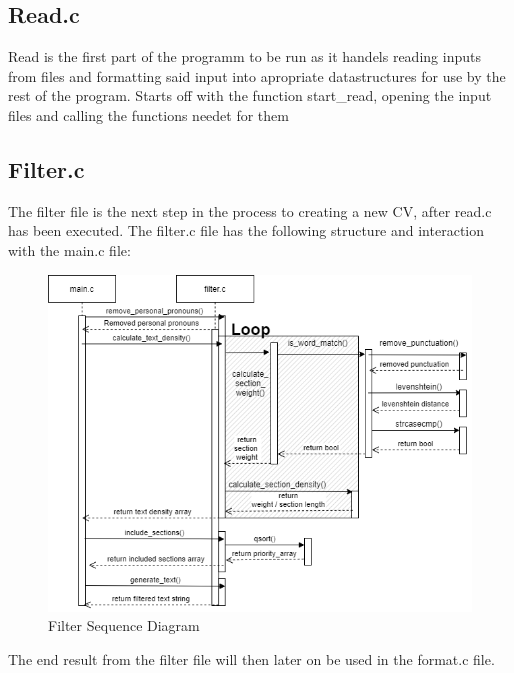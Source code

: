 \subsection{Read.c}
Read is the first part of the programm to be run as it handels reading inputs from files and formatting said input into apropriate datastructures for use by the rest of the program.
Starts off with the function start\_read, opening the input files and calling the functions needet for them

\subsection{Filter.c}
The filter file is the next step in the process to creating a new CV, after read.c has been executed.
The filter.c file has the following structure and interaction with the main.c file:
\begin{figure}[H]
  \centering
  \includegraphics[scale = 0.6]{figures/filter_flow.png}
  \caption{Filter Sequence Diagram}
\end{figure}
The end result from the filter file will then later on be used in the format.c file.


